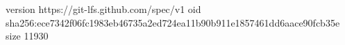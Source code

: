 version https://git-lfs.github.com/spec/v1
oid sha256:ece7342f06fc1983eb46735a2ed724ea11b90b911e1857461dd6aace90fcb35e
size 11930
